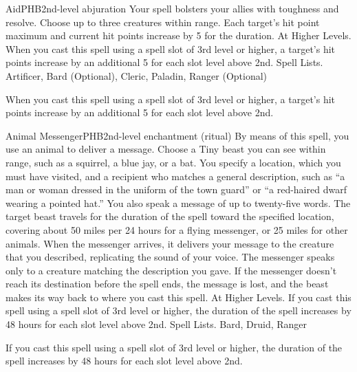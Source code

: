 \begin{spell}{Aid}{PHB}{2nd-level abjuration}
{
}
Your spell bolsters your allies with toughness and resolve. Choose up to three creatures within range. Each target’s hit point maximum and current hit points increase by 5 for the duration.
At Higher Levels. When you cast this spell using a spell slot of 3rd level or higher, a target’s hit points increase by an additional 5 for each slot level above 2nd.
Spell Lists. Artificer, Bard (Optional), Cleric, Paladin, Ranger (Optional)

 When you cast this spell using a spell slot of 3rd level or higher, a target’s hit points increase by an additional 5 for each slot level above 2nd.
\end{spell}

\begin{spell}{Animal Messenger}{PHB}{2nd-level enchantment (ritual)}
{
}
By means of this spell, you use an animal to deliver a message. Choose a Tiny beast you can see within range, such as a squirrel, a blue jay, or a bat. You specify a location, which you must have visited, and a recipient who matches a general description, such as “a man or woman dressed in the uniform of the town guard” or “a red-haired dwarf wearing a pointed hat.” You also speak a message of up to twenty-five words. The target beast travels for the duration of the spell toward the specified location, covering about 50 miles per 24 hours for a flying messenger, or 25 miles for other animals.
When the messenger arrives, it delivers your message to the creature that you described, replicating the sound of your voice. The messenger speaks only to a creature matching the description you gave. If the messenger doesn’t reach its destination before the spell ends, the message is lost, and the beast makes its way back to where you cast this spell.
At Higher Levels. If you cast this spell using a spell slot of 3rd level or higher, the duration of the spell increases by 48 hours for each slot level above 2nd.
Spell Lists. Bard, Druid, Ranger

 If you cast this spell using a spell slot of 3rd level or higher, the duration of the spell increases by 48 hours for each slot level above 2nd.
\end{spell}

